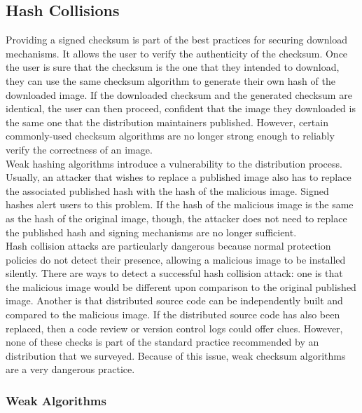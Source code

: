 \documentclass[conference]{IEEEtran}
\begin{document}
\subsection{Hash Collisions}

Providing a signed checksum is part of the best practices for securing download mechanisms. It
allows the user to verify the authenticity of the checksum. Once the user is sure that the
checksum is the one that they intended to download, they can use the same checksum algorithm to
generate their own hash of the downloaded image. If the downloaded checksum and the generated
checksum are identical, the user can then proceed, confident that the image they downloaded is
the same one that the distribution maintainers published. However, certain commonly-used
checksum algorithms are no longer strong enough to reliably verify the correctness of an image.\\
\indent Weak hashing algorithms introduce a vulnerability to the distribution process. Usually,
an attacker that wishes to replace a published image also has to replace the associated
published hash with the hash of the malicious image. Signed hashes alert users to this problem.
If the hash of the malicious image is the same as the hash of the original image, though, the
attacker does not need to replace the published hash and signing mechanisms are no longer
sufficient.\\
\indent Hash collision attacks are particularly dangerous because normal protection policies do
not detect their presence, allowing a malicious image to be installed silently. There are ways
to detect a successful hash collision attack: one is that the malicious image would be different
upon comparison to the original published image. Another is that distributed source code can be
independently built and compared to the malicious image. If the distributed source code has also
been replaced, then a code review or version control logs could offer clues. However, none of
these checks is part of the standard practice recommended by an distribution that we surveyed.
Because of this issue, weak checksum algorithms are a very dangerous practice.
\subsubsection{Weak Algorithms}
\end{document}
